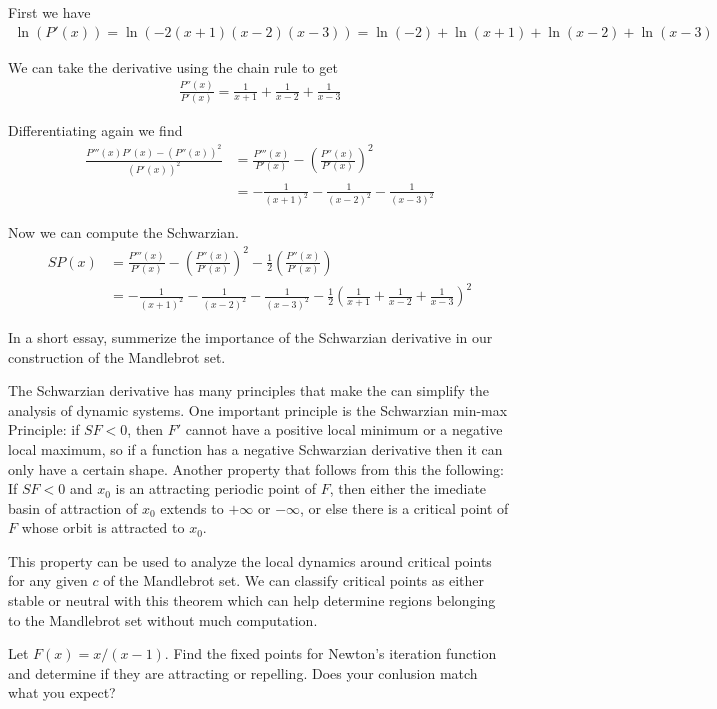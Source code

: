 \documentclass[12pt]{article}
\newenvironment{problem}[2][Problem]{\begin{trivlist}
\item[\hskip \labelsep {\bfseries #1} \hskip \labelsep {\bfseries #2.}]}{\end{trivlist}}
\begin{document}
First we have
\begin{align*}
	\ln(P'(x)) = \ln(-2(x+1)(x-2)(x-3)) = \ln(-2) + \ln(x+1) + \ln(x-2) + \ln(x-3)
\end{align*}

We can take the derivative using the chain rule to get
\begin{align*}
	\frac{P''(x)}{P'(x)} = \frac{1}{x + 1} + \frac{1}{x - 2} + \frac{1}{x - 3}
\end{align*}

Differentiating again we find
\begin{align*}
	\frac{P'''(x)P'(x) - (P''(x))^2}{(P'(x))^2} &= \frac{P'''(x)}{P'(x)} - \left(\frac{P''(x)}{P'(x)}\right)^2 \\
						    &= -\frac{1}{(x+1)^2} - \frac{1}{(x-2)^2} - \frac{1}{(x-3)^2}
\end{align*}

Now we can compute the Schwarzian.
\begin{align*}
	SP(x) &= \frac{P'''(x)}{P'(x)} - \left(\frac{P''(x)}{P'(x)}\right)^2 - \frac{1}{2}\left(\frac{P''(x)}{P'(x)}\right) \\
	      &= -\frac{1}{(x+1)^2} - \frac{1}{(x-2)^2} - \frac{1}{(x-3)^2} - \frac{1}{2}\left(\frac{1}{x + 1} + \frac{1}{x - 2} + \frac{1}{x - 3}\right)^2
\end{align*}

\begin{tcolorbox}[colback=blue!5!white,colframe=blue!75!black]
	\begin{problem}{4b}
		In a short essay, summerize the importance of the Schwarzian derivative in our construction of the Mandlebrot set.
	\end{problem}	
\end{tcolorbox}

The Schwarzian derivative has many principles that make the can simplify the analysis of dynamic systems. One important principle is the Schwarzian min-max Principle: if $SF < 0$, then $F'$ cannot have a positive local minimum or a negative local maximum, so if a function has a negative Schwarzian derivative then it can only have a certain shape. Another property that follows from this the following: If $SF < 0$ and $x_0$ is an attracting periodic point of $F$, then either the imediate basin of attraction of $x_0$ extends to $+\infty$ or $-\infty$, or else there is a critical point of $F$ whose orbit is attracted to $x_0$.

This property can be used to analyze the local dynamics around critical points for any given $c$ of the Mandlebrot set. We can classify critical points as either stable or neutral with this theorem which can help determine regions belonging to the Mandlebrot set without much computation.
\begin{tcolorbox}[colback=blue!5!white,colframe=blue!75!black]
	\begin{problem}{5}
		Let $F(x) = x/(x-1)$. Find the fixed points for Newton's iteration function and determine if they are attracting or repelling. Does your conlusion match what you expect?
	\end{problem}	
\end{tcolorbox}
\end{document}

